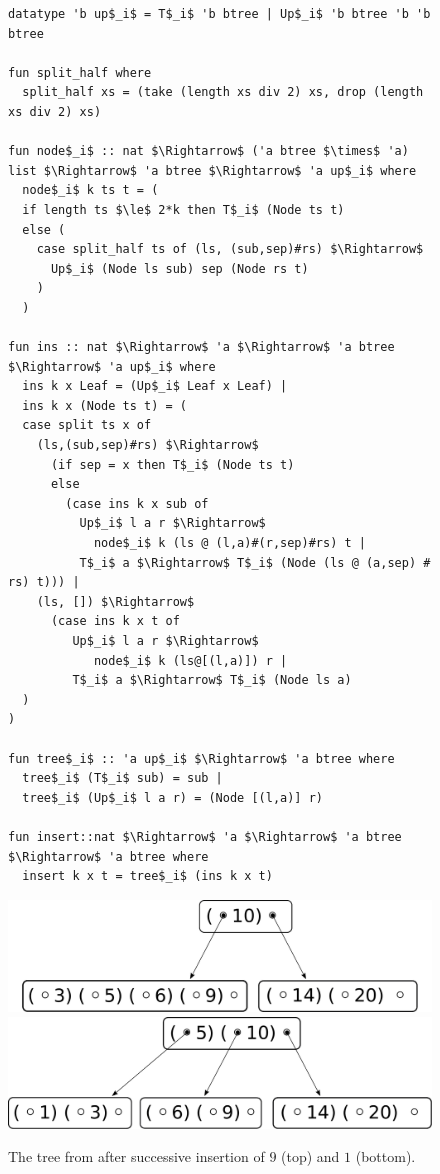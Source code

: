 \begin{figure}
    
\begin{lstlisting}[mathescape=true, language=Isabelle, label=lst:ins-fun, caption={
    The \textit{insert} function
}]
datatype 'b up$_i$ = T$_i$ 'b btree | Up$_i$ 'b btree 'b 'b btree

fun split_half where
  split_half xs = (take (length xs div 2) xs, drop (length xs div 2) xs)

fun node$_i$ :: nat $\Rightarrow$ ('a btree $\times$ 'a) list $\Rightarrow$ 'a btree $\Rightarrow$ 'a up$_i$ where
  node$_i$ k ts t = (
  if length ts $\le$ 2*k then T$_i$ (Node ts t)
  else (
    case split_half ts of (ls, (sub,sep)#rs) $\Rightarrow$
      Up$_i$ (Node ls sub) sep (Node rs t)
    )
  )

fun ins :: nat $\Rightarrow$ 'a $\Rightarrow$ 'a btree $\Rightarrow$ 'a up$_i$ where
  ins k x Leaf = (Up$_i$ Leaf x Leaf) |
  ins k x (Node ts t) = (
  case split ts x of
    (ls,(sub,sep)#rs) $\Rightarrow$ 
      (if sep = x then T$_i$ (Node ts t)
      else
        (case ins k x sub of 
          Up$_i$ l a r $\Rightarrow$
            node$_i$ k (ls @ (l,a)#(r,sep)#rs) t | 
          T$_i$ a $\Rightarrow$ T$_i$ (Node (ls @ (a,sep) # rs) t))) |
    (ls, []) $\Rightarrow$
      (case ins k x t of
         Up$_i$ l a r $\Rightarrow$
            node$_i$ k (ls@[(l,a)]) r |
         T$_i$ a $\Rightarrow$ T$_i$ (Node ls a)
  )
)

fun tree$_i$ :: 'a up$_i$ $\Rightarrow$ 'a btree where
  tree$_i$ (T$_i$ sub) = sub |
  tree$_i$ (Up$_i$ l a r) = (Node [(l,a)] r)

fun insert::nat $\Rightarrow$ 'a $\Rightarrow$ 'a btree $\Rightarrow$ 'a btree where
  insert k x t = tree$_i$ (ins k x t)
\end{lstlisting}

\end{figure}

\begin{figure}
    \centering
    \includegraphics[width=0.48\linewidth]{figures/btree-basic-ins9.pdf}\\
    \vspace*{1cm}
    \includegraphics[width=0.48\linewidth]{figures/btree-basic-ins9-ins1.pdf}
    \caption[An example B-Tree after two insertion operations]
    {The tree from  after 
    successive insertion of $9$ (top) and $1$ (bottom).}
    \label{fig:btree-basic-ins}
\end{figure}

